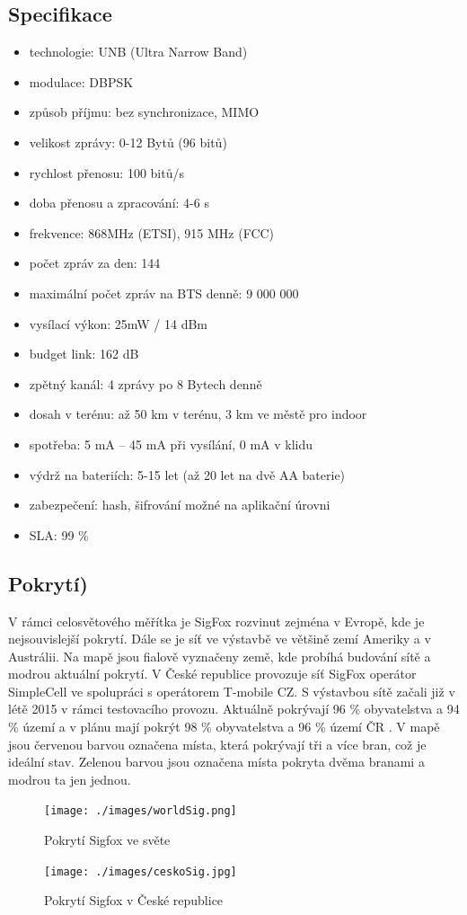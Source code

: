 \documentclass{ctuthesis}
\begin{document}
\subsection{Specifikace}
\begin{itemize}
\item technologie: UNB (Ultra Narrow Band)
\item modulace: DBPSK
\item způsob příjmu: bez synchronizace, MIMO
\item velikost zprávy: 0-12 Bytů (96 bitů)
\item rychlost přenosu: 100 bitů/s
\item doba přenosu a zpracování: 4-6 s
\item frekvence: 868MHz (ETSI), 915 MHz (FCC)
\item počet zpráv za den: 144
\item maximální počet zpráv na BTS denně: 9 000 000
\item vysílací výkon: 25mW / 14 dBm
\item budget link: 162 dB
\item zpětný kanál: 4 zprávy po 8 Bytech denně
\item dosah v terénu: až 50 km v terénu, 3 km ve městě pro indoor
\item spotřeba: 5 mA – 45 mA při vysílání, 0 mA v klidu 
\item výdrž na bateriích: 5-15 let (až 20 let na dvě AA baterie)
\item zabezpečení: hash, šifrování možné na aplikační úrovni
\item SLA: 99 \% \cite{iotportalSigfox}
\end{itemize}
\subsection{Pokrytí)}
V rámci celosvětového měřítka je SigFox rozvinut zejména v Evropě, kde je nejsouvislejší pokrytí. Dále se je síť ve výstavbě ve většině zemí Ameriky a v Austrálii.
Na mapě jsou fialově vyznačeny země, kde probíhá budování sítě a modrou aktuální pokrytí.
V České republice provozuje síť SigFox operátor SimpleCell ve spolupráci s operátorem T-mobile CZ. S výstavbou sítě začali již v létě 2015 v rámci testovacího provozu. Aktuálně pokrývají 96 \% obyvatelstva a 94 \% území a v plánu mají pokrýt 98 \% obyvatelstva a 96 \% území ČR \cite{simplecell}. V mapě jsou červenou barvou označena místa, která pokrývají tři a více bran, což je ideální stav.  Zelenou barvou jsou označena místa pokryta dvěma branami a modrou ta jen jednou.
\begin{figure}
\caption{Pokrytí Sigfox ve světe\cite{wolrdsigfox}}
\texttt{[image: ./images/worldSig.png]}
\label{dbpsk}
\end{figure}
\begin{figure}
\caption{Pokrytí Sigfox v České republice \cite{iotportal}}
\texttt{[image: ./images/ceskoSig.jpg]}
\label{dbpsk}
\end{figure}
\end{document}
